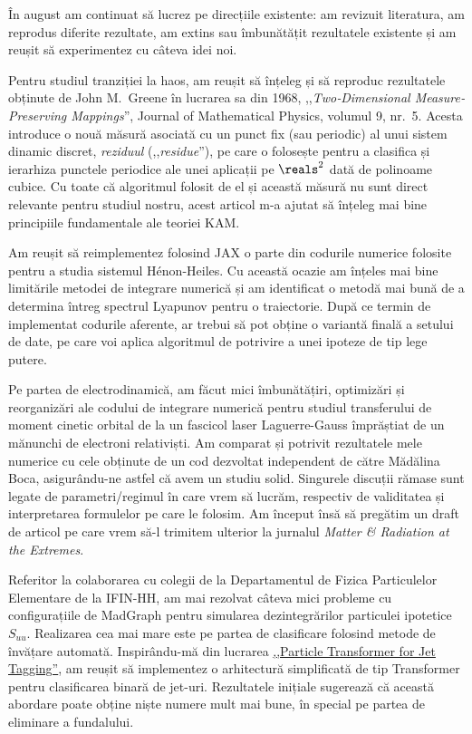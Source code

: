 
\makereportpreamble

În august am continuat să lucrez pe direcțiile existente: am revizuit literatura, am reprodus diferite rezultate, am extins sau îmbunătățit rezultatele existente și am reușit să experimentez cu câteva idei noi.

Pentru studiul tranziției la haos, am reușit să înțeleg și să reproduc rezultatele obținute de John M.\ Greene în lucrarea sa din 1968, ,,\textit{Two‐Dimensional Measure‐Preserving Mappings}'', Journal of Mathematical Physics, volumul 9, nr.~5. Acesta introduce o nouă măsură asociată cu un punct fix (sau periodic) al unui sistem dinamic discret, \emph{reziduul} (,,\textit{residue}''), pe care o folosește pentru a clasifica și ierarhiza punctele periodice ale unei aplicații pe \(\reals^2\) dată de polinoame cubice. Cu toate că algoritmul folosit de el și această măsură nu sunt direct relevante pentru studiul nostru, acest articol m-a ajutat să înțeleg mai bine principiile fundamentale ale teoriei KAM.

Am reușit să reimplementez folosind JAX o parte din codurile numerice folosite pentru a studia sistemul Hénon-Heiles. Cu această ocazie am înțeles mai bine limitările metodei de integrare numerică și am identificat o metodă mai bună de a determina întreg spectrul Lyapunov pentru o traiectorie. După ce termin de implementat codurile aferente, ar trebui să pot obține o variantă finală a setului de date, pe care voi aplica algoritmul de potrivire a unei ipoteze de tip lege putere.

Pe partea de electrodinamică, am făcut mici îmbunătățiri, optimizări și reorganizări ale codului de integrare numerică pentru studiul transferului de moment cinetic orbital de la un fascicol laser Laguerre-Gauss împrăștiat de un mănunchi de electroni relativiști. Am comparat și potrivit rezultatele mele numerice cu cele obținute de un cod dezvoltat independent de către Mădălina Boca, asigurându-ne astfel că avem un studiu solid. Singurele discuții rămase sunt legate de parametri/regimul în care vrem să lucrăm, respectiv de validitatea și interpretarea formulelor pe care le folosim. Am început însă să pregătim un draft de articol pe care vrem să-l trimitem ulterior la jurnalul \textit{Matter \& Radiation at the Extremes}.

Referitor la colaborarea cu colegii de la Departamentul de Fizica Particulelor Elementare de la IFIN-HH, am mai rezolvat câteva mici probleme cu configurațiile de MadGraph pentru simularea dezintegrărilor particulei ipotetice \(S_{uu}\). Realizarea cea mai mare este pe partea de clasificare folosind metode de învățare automată. Inspirându-mă din lucrarea \href{https://arxiv.org/abs/2202.03772}{,,Particle Transformer for Jet Tagging''}, am reușit să implementez o arhitectură simplificată de tip Transformer pentru clasificarea binară de jet-uri. Rezultatele inițiale sugerează că această abordare poate obține niște numere mult mai bune, în special pe partea de eliminare a fundalului.

